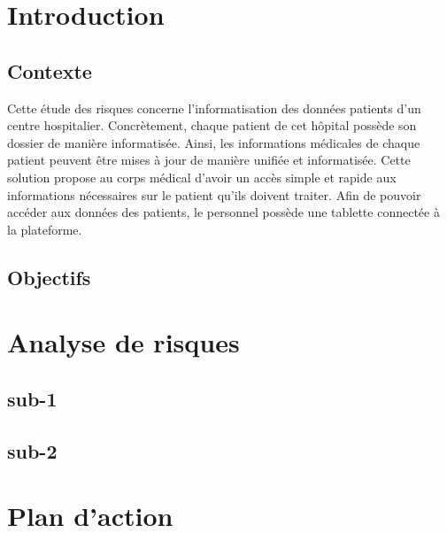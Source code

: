 \documentclass[12pt]{article}
\begin{document}
\newpage
\renewcommand{\contentsname}{Table des matières}
\tableofcontents
\newpage

\section{Introduction}

\subsection{Contexte}

Cette étude des risques concerne l'informatisation des données patients d'un centre hospitalier. Concrètement, chaque patient de cet hôpital possède son dossier de manière informatisée. Ainsi, les informations médicales de chaque patient peuvent être mises à jour de manière unifiée et informatisée. Cette solution propose au corps médical d'avoir un accès simple et rapide aux informations nécessaires sur le patient qu'ils doivent traiter. Afin de pouvoir accéder aux données des patients, le personnel possède une tablette connectée à la plateforme. 

\subsection{Objectifs}



\section{Analyse de risques}

\subsection{sub-1}

\subsection{sub-2}

\section{Plan d'action}
\end{document}
